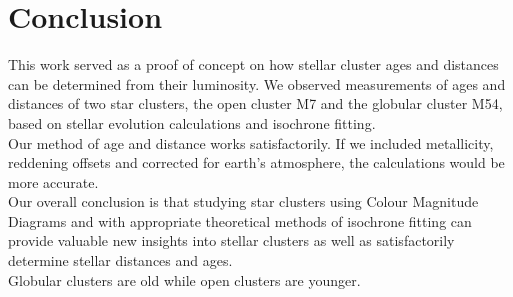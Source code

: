 \documentclass[12pt]{article}
\begin{document}
	\section{Conclusion}
	This work served as a proof of concept on how stellar cluster ages and distances can be determined from their luminosity. We observed measurements of ages and distances of two star clusters, the open cluster M7 and the globular cluster M54, based on stellar evolution calculations and isochrone fitting.\\
	Our method of age and distance works satisfactorily. If we included metallicity, reddening offsets and corrected for earth's atmosphere, the calculations would be more accurate.\\
	Our overall conclusion is that studying star clusters using Colour Magnitude Diagrams and with appropriate theoretical methods of isochrone fitting can provide valuable new insights into stellar clusters as well as satisfactorily determine stellar distances and ages.\\
	Globular clusters are old while open clusters are younger.
		
\end{document}
